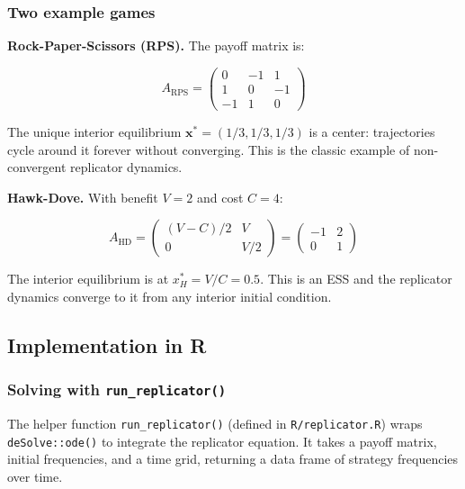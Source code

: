 \documentclass[
]{article}
\begin{document}
\subsubsection{Two example games}\label{two-example-games}

\textbf{Rock-Paper-Scissors (RPS).} The payoff matrix is:

\[
A_{\text{RPS}} = \begin{pmatrix} 0 & -1 & 1 \\ 1 & 0 & -1 \\ -1 & 1 & 0 \end{pmatrix}
\]

The unique interior equilibrium \(\mathbf{x}^* = (1/3, 1/3, 1/3)\) is a
center: trajectories cycle around it forever without converging. This is
the classic example of non-convergent replicator dynamics.

\textbf{Hawk-Dove.} With benefit \(V = 2\) and cost \(C = 4\):

\[
A_{\text{HD}} = \begin{pmatrix} (V - C)/2 & V \\ 0 & V/2 \end{pmatrix} = \begin{pmatrix} -1 & 2 \\ 0 & 1 \end{pmatrix}
\]

The interior equilibrium is at \(x_H^* = V/C = 0.5\). This is an ESS and
the replicator dynamics converge to it from any interior initial
condition.

\subsection{Implementation in R}\label{sec-replicator-implementation}

\subsubsection{\texorpdfstring{Solving with
\texttt{run\_replicator()}}{Solving with run\_replicator()}}\label{solving-with-run_replicator}

The helper function \texttt{run\_replicator()} (defined in
\texttt{R/replicator.R}) wraps \texttt{deSolve::ode()} to integrate the
replicator equation. It takes a payoff matrix, initial frequencies, and
a time grid, returning a data frame of strategy frequencies over time.
\end{document}
